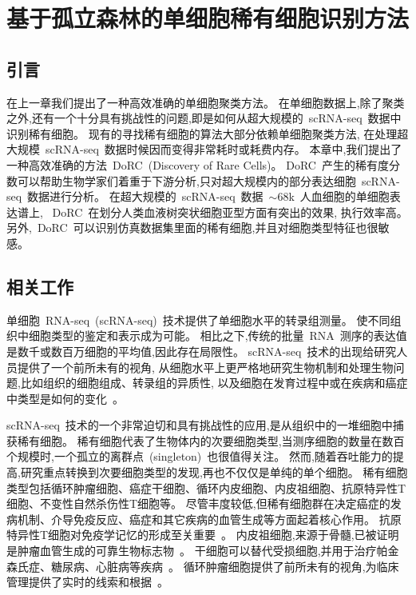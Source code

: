 \section{基于孤立森林的单细胞稀有细胞识别方法}
\label{sec:dorc}

\subsection{引言}
在上一章我们提出了一种高效准确的单细胞聚类方法。
在单细胞数据上,除了聚类之外,还有一个十分具有挑战性的问题,即是如何从超大规模的~scRNA-seq~数据中识别稀有细胞。
现有的寻找稀有细胞的算法大部分依赖单细胞聚类方法,
在处理超大规模~scRNA-seq~数据时候因而变得非常耗时或耗费内存。
本章中,我们提出了一种高效准确的方法~DoRC~(Discovery of Rare Cells)。
DoRC~产生的稀有度分数可以帮助生物学家们着重于下游分析,只对超大规模内的部分表达细胞~scRNA-seq~数据进行分析。
在超大规模的~scRNA-seq~数据~${\sim}68$k~人血细胞的单细胞表达谱上,
~DoRC~在划分人类血液树突状细胞亚型方面有突出的效果, 执行效率高。
另外,~DoRC~可以识别仿真数据集里面的稀有细胞,并且对细胞类型特征也很敏感。

\subsection{相关工作}
单细胞~RNA-seq~(scRNA-seq)~技术提供了单细胞水平的转录组测量。
使不同组织中细胞类型的鉴定和表示成为可能。
相比之下,传统的批量~RNA~测序的表达值是数千或数百万细胞的平均值,因此存在局限性。
scRNA-seq~技术的出现给研究人员提供了一个前所未有的视角,
从细胞水平上更严格地研究生物机制和处理生物问题,比如组织的细胞组成、转录组的异质性,
以及细胞在发育过程中或在疾病和癌症中类型是如何的变化~\cite{kumar2017understanding,patel2014single}。

scRNA-seq~技术的一个非常迫切和具有挑战性的应用,是从组织中的一堆细胞中捕获稀有细胞。
稀有细胞代表了生物体内的次要细胞类型,当测序细胞的数量在数百个规模时,一个孤立的离群点~(singleton)~也很值得关注。
然而,随着吞吐能力的提高,研究重点转换到次要细胞类型的发现,再也不仅仅是单纯的单个细胞。
稀有细胞类型包括循环肿瘤细胞、癌症干细胞、循环内皮细胞、内皮祖细胞、抗原特异性T细胞、不变性自然杀伤性T细胞等。
尽管丰度较低,但稀有细胞群在决定癌症的发病机制、介导免疫反应、癌症和其它疾病的血管生成等方面起着核心作用。
抗原特异性T细胞对免疫学记忆的形成至关重要~\cite{slansky2003antigen,altman1996phenotypic,manzo2015antigen}。
内皮祖细胞,来源于骨髓,已被证明是肿瘤血管生成的可靠生物标志物~\cite{kuo2012dynamics,cima2016tumor}。
干细胞可以替代受损细胞,并用于治疗帕金森氏症、糖尿病、心脏病等疾病~\cite{jang2005stem}。
循环肿瘤细胞提供了前所未有的视角,为临床管理提供了实时的线索和根据~\cite{krebs2010circulating}。

